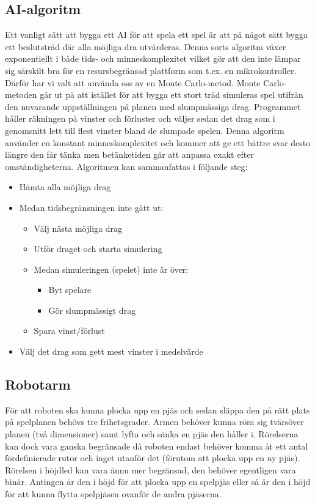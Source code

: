 \documentclass[a4paper]{article}
\begin{document}
\subsection{AI-algoritm} \label{AI}
Ett vanligt sätt att bygga ett AI för att spela ett spel är att på något sätt bygga ett beslutsträd där alla möjliga dra utvärderas.
Denna sorts algoritm växer exponentiellt i både tids- och minneskomplexitet vilket gör att den inte lämpar sig särskilt bra för en resursbegränsad plattform som t.ex. en mikrokontroller.
Därför har vi valt att använda oss av en Monte Carlo-metod.
Monte Carlo-metoden går ut på att istället för att bygga ett stort träd simuleras spel utifrån den nuvarande uppställningen på planen med slumpmässiga drag.
Programmet håller räkningen på vinster och förluster och väljer sedan det drag som i genomsnitt lett till flest vinster bland de slumpade spelen.
Denna algoritm använder en konstant minneskomplexitet och kommer att ge ett bättre svar desto längre den får tänka men betänketiden går att anpassa exakt efter omständigheterna.
Algoritmen kan sammanfattas i följande steg:
\begin{itemize}
\item Hämta alla möjliga drag
\item Medan tidsbegränsningen inte gått ut: 
	\begin{itemize} 
	\item Välj nästa möjliga drag
	\item Utför draget och starta simulering
	\item Medan simuleringen (spelet) inte är över:
		\begin{itemize}
		\item Byt spelare
		\item Gör slumpmässigt drag
		\end{itemize}	
	\item Spara vinst/förlust
	\end{itemize}
\item Välj det drag som gett mest vinster i medelvärde
\end{itemize}

\subsection{Robotarm}
För att roboten ska kunna plocka upp en pjäs och sedan släppa den på rätt plats på spelplanen behövs tre frihetsgrader.
Armen behöver kunna röra sig tvärsöver planen (två dimensioner) samt lyfta och sänka en pjäs den håller i.
Rörelserna kan dock vara ganska begränsade då roboten endast behöver komma åt ett antal fördefinierade rutor och inget utanför det (förutom att plocka upp en ny pjäs).
Rörelsen i höjdled kan vara ännu mer begränsad, den behöver egentligen vara binär.
Antingen är den i höjd för att plocka upp en spelpjäs eller så är den i höjd för att kunna flytta spelpjäsen ovanför de andra pjäserna.
\end{document}
